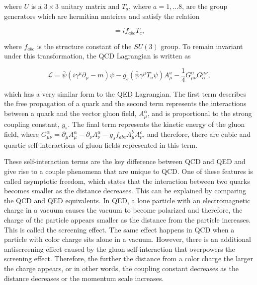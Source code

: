 \noindent
where $U$ is a $3\times3$ unitary matrix and $T_{a}$, where $a=1,...8$, are the group generators which are hermitian matrices and satisfy the relation

\begin{equation}
[T_{a},T_{b}] = if_{abc}T_{c},
\end{equation}

\noindent
where $f_{abc}$ is the structure constant of the $SU(3)$ group. To remain invariant under this transformation, the QCD Lagrangian is written as


\begin{equation}
\mathcal{L}= \bar{\psi}(i\gamma^{\mu}\partial_{\mu} - m)\psi - g_{s}(\bar{\psi}\gamma^{\mu}T_{a}\psi)A^{a}_{\mu} - \frac{1}{4}G^{\alpha}_{\mu\nu}G^{\mu\nu}_{\alpha},
\end{equation}
 
\noindent
which has a very similar form to the QED Lagrangian. The first term describes the free propagation of a quark and the second term represents the interactions between a quark and the vector gluon field, $A^{\alpha}_{\mu}$, and is proportional to the strong coupling constant, $g_{s}$. The final term represents the kinetic energy of the gluon field, where $G^{\alpha}_{\mu\nu}=\partial_{\mu}A^{\alpha}_{\mu} - \partial_{\nu}A^{\alpha}_{\nu} - g_{s}f_{abc}A^{b}_{\mu}A^{c}_{\nu}$, and therefore, there are cubic and quartic self-interactions of gluon fields represented in this term.

These self-interaction terms are the key difference between QCD and QED and give rise to a couple phenomena that are unique to QCD. One of these features is called asymptotic freedom, which states that the interaction between two quarks becomes smaller as the distance decreases. This can be explained by comparing the QCD and QED equivalents. In QED, a lone particle with an electromagnetic charge in a vacuum causes the vacuum to become polarized and therefore, the charge of the particle appears smaller as the distance from the particle increases. This is called the screening effect. The same effect happens in QCD when a particle with color charge sits alone in a vacuum. However, there is an additional antiscreening effect caused by the gluon self-interaction that overpowers the screening effect. Therefore, the further the distance from a color charge the larger the charge appears, or in other words, the coupling constant decreases as the distance decreases or the momentum scale increases.

